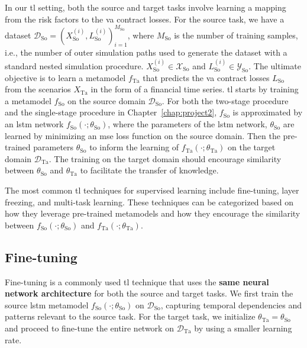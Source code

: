 In our \gls{tl} setting, both the source and target tasks involve learning a mapping from the risk factors to the \gls{va} contract losses.
For the source task, we have a dataset $\mathcal{D}_{\text{So}} = { (X_{\text{So}}^{(i)}, L_{\text{So}}^{(i)}) }_{i=1}^{M_{\text{So}}}$, where $M_{\text{So}}$ is the number of training samples, i.e., the number of outer simulation paths used to generate the dataset with a standard nested simulation procedure.
$X_{\text{So}}^{(i)} \in \mathcal{X}_{\text{So}}$ and $L_{\text{So}}^{(i)} \in \mathcal{Y}_{\text{So}}$.
The ultimate objective is to learn a metamodel $f_{\text{Ta}}$ that predicts the \gls{va} contract losses $L_{\text{So}}$ from the scenarios $X_{\text{Ta}}$ in the form of a financial time series.
\gls{tl} starts by training a metamodel $f_{\text{So}}$ on the source domain $\mathcal{D}_{\text{So}}$.
For both the two-stage procedure and the single-stage procedure in Chapter~\ref{chap:project2}, $f_{\text{So}}$ is approximated by an \gls{lstm} network $f_{\text{So}}(\cdot ; \theta_{\text{So}})$, where the parameters of the \gls{lstm} network, $\theta_{\text{So}}$ are learned by minimizing an \gls{mse} loss function on the source domain.
Then the pre-trained parameters $\theta_{\text{So}}$ to inform the learning of $f_{\text{Ta}}(\cdot ; \theta_{\text{Ta}})$ on the target domain $\mathcal{D}_{\text{Ta}}$.
The training on the target domain should encourage similarity between $\theta_{\text{So}}$ and $\theta_{\text{Ta}}$ to facilitate the transfer of knowledge.

The most common \gls{tl} techniques for supervised learning include fine-tuning, layer freezing, and multi-task learning. 
These techniques can be categorized based on how they leverage pre-trained metamodels and how they encourage the similarity between $f_{\text{So}}(\cdot ; \theta_{\text{So}})$ and $f_{\text{Ta}}(\cdot ; \theta_{\text{Ta}})$.

\subsection{Fine-tuning}

Fine-tuning is a commonly used \gls{tl} technique that uses the \textbf{same neural network architecture} for both the source and target tasks.
We first train the source \gls{lstm} metamodel $f_{\text{So}}(\cdot; \theta_{\text{So}})$ on $\mathcal{D}_{\text{So}}$, capturing temporal dependencies and patterns relevant to the source task. 
For the target task, we initialize $\theta_{\text{Ta}} = \theta_{\text{So}}$ and proceed to fine-tune the entire network on $\mathcal{D}_{\text{Ta}}$ by using a smaller learning rate. 

